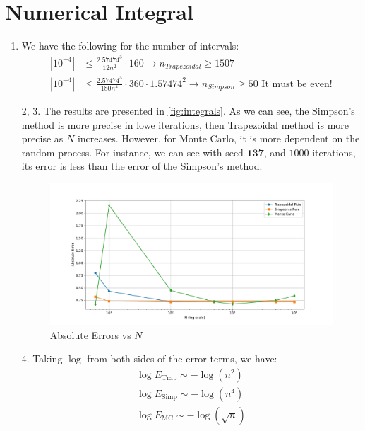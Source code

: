 \documentclass[a4paper,10pt,american]{article}
\begin{document}
\newpage
\section{Numerical Integral}
\begin{enumerate}
    \item We have the following for the number of intervals:
    \begin{align}
        |10^{-4}| &\leq \frac{2.57474^3}{12n^2}\cdot 160\to n_{Trapezoidal}\geq 1507\\
        |10^{-4}| &\leq \frac{2.57474^5}{180n^4}\cdot 360\cdot 1.57474^2\to n_{Simpson}\geq 50\text{ It must be even!}
    \end{align}


    \item [2, 3.] The results are presented in \autoref{fig:integrals}. As we can see, the Simpson's method is more precise in lowe iterations, then Trapezoidal method is more precise as $N$ increases. However, for Monte Carlo, it is more dependent on the random process. For instance, we can see with seed $\boldsymbol{137}$, and $1000$ iterations, its error is less than the error of the Simpson's method.
    \begin{figure}[H]
        \centering
        \includegraphics[width=1\linewidth]{../Plots/integrals.pdf}
        \caption{Absolute Errors vs $N$}
        \label{fig:integrals}
    \end{figure}

    \item [4.] Taking $\log$ from both sides of the error terms, we have:
    \begin{align}
        \log E_{\text{Trap}} \sim -\log (n^2)\\
        \log E_{\text{Simp}} \sim -\log (n^4)\\
        \log E_{\text{MC}} \sim -\log (\sqrt{n})
    \end{align}


\end{enumerate}
\end{document}

